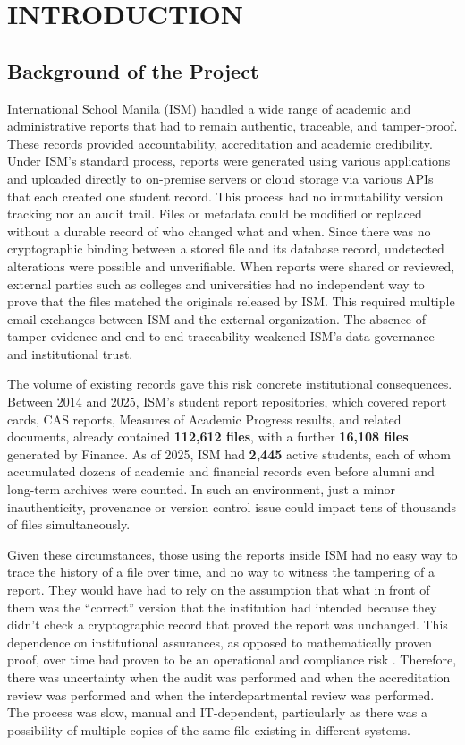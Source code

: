 \section{INTRODUCTION}
    \subsection{Background of the Project}

International School Manila (ISM) handled a wide range of academic and administrative reports that had to remain authentic, traceable, and tamper-proof. These records provided accountability, accreditation and academic credibility. Under ISM's standard process, reports were generated using various applications and uploaded directly to on-premise servers or cloud storage via various APIs that each created one student record. This process had no immutability version tracking nor an audit trail. Files or metadata could be modified or replaced without a durable record of who changed what and when. Since there was no cryptographic binding between a stored file and its database record, undetected alterations were possible and unverifiable. When reports were shared or reviewed, external parties such as colleges and universities had no independent way to prove that the files matched the originals released by ISM. This required multiple email exchanges between ISM and the external organization. The absence of tamper-evidence and end-to-end traceability weakened ISM's data governance and institutional trust.

The volume of existing records gave this risk concrete institutional consequences. Between 2014 and 2025, ISM's student report repositories, which covered report cards, CAS reports, Measures of Academic Progress results, and related documents, already contained \textbf{112,612 files}, with a further \textbf{16,108 files} generated by Finance. As of 2025, ISM had \textbf{2,445} active students, each of whom accumulated dozens of academic and financial records even before alumni and long-term archives were counted. In such an environment, just a minor inauthenticity, provenance or version control issue could impact tens of thousands of files simultaneously.

Given these circumstances, those using the reports inside ISM had no easy way to trace the history of a file over time, and no way to witness the tampering of a report. They would have had to rely on the assumption that what in front of them was the “correct” version that the institution had intended because they didn't check a cryptographic record that proved the report was unchanged. This dependence on institutional assurances, as opposed to mathematically proven proof, over time had proven to be an operational and compliance risk \citep{Cflow2025,Encrypthos2025,NRC2005,SimpleButNeeded2025}. Therefore, there was uncertainty when the audit was performed and when the accreditation review was performed and when the interdepartmental review was performed. The process was slow, manual and IT-dependent, particularly as there was a possibility of multiple copies of the same file existing in different systems.

